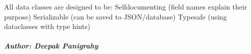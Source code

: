 \documentclass[letterpaper,10pt,english]{sphinxmanual}
\begin{document}
\sphinxAtStartPar
All data classes are designed to be:
\sphinxhyphen{} Self\sphinxhyphen{}documenting (field names explain their purpose)
\sphinxhyphen{} Serializable (can be saved to JSON/database)
\sphinxhyphen{} Type\sphinxhyphen{}safe (using dataclasses with type hints)


\subparagraph{Author: Deepak Panigrahy}
\label{\detokenize{core.models.energy_measurement:author-deepak-panigrahy}}

\begin{fulllineitems}
\label{\detokenize{core.models.energy_measurement:core.models.energy_measurement.EnergyMeasurement}}
\pysigstartsignatures
\pysiglinewithargsret
{}

\end{fulllineitems}
\end{document}
